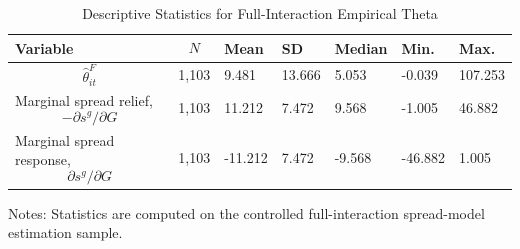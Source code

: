 \begin{table}[H]\centering
\begin{threeparttable}
\caption{Descriptive Statistics for Full-Interaction Empirical Theta}
\label{tab:theta_descriptive_stats}
\scriptsize
\begin{tabularx}{\textwidth}{lYYYYYY}
\toprule
Variable & $$N$$ & Mean & SD & Median & Min. & Max. \\
\midrule
$$\widehat{\theta}^{F}_{it}$$ & 1,103 & 9.481 & 13.666 & 5.053 & -0.039 & 107.253 \\
Marginal spread relief, $$-\partial s^g/\partial G$$ & 1,103 & 11.212 & 7.472 & 9.568 & -1.005 & 46.882 \\
Marginal spread response, $$\partial s^g/\partial G$$ & 1,103 & -11.212 & 7.472 & -9.568 & -46.882 & 1.005 \\
\bottomrule
\end{tabularx}
\begin{tablenotes}[flushleft]\footnotesize
\item Notes: Statistics are computed on the controlled full-interaction spread-model estimation sample.
\end{tablenotes}
\end{threeparttable}
\end{table}
